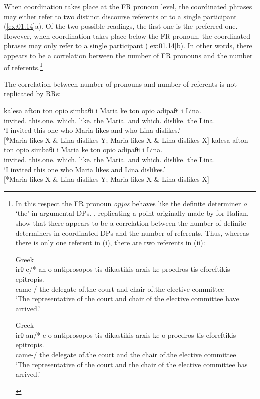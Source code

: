 \documentclass[output=paper]{langsci/langscibook}
\begin{document}
When coordination takes place at the \gls{FR} pronoun level, the coordinated\linebreak
phrases may either refer to two distinct discourse referents or to a single
participant (\ref{ex:01.14}a). Of the two possible readings, the first one
is the preferred one. However, when coordination takes place below the \gls{FR}
pronoun, the coordinated phrases may only refer to a single participant
(\ref{ex:01.14}b). In other words, there appears to be a correlation
between the number of \gls{FR} pronouns and the number of
referents.\footnote{In this respect the \gls{FR} pronoun \emph{opjos} behaves
    like the definite determiner \emph{o} ‘the’ in argumental DPs.
    \textcite[67--68]{AleHaeSta2007}, replicating a point originally made by
    \citet{Longobardi1994} for Italian, show that there appears to be a
    correlation between the number of definite determiners in coordinated DPs
    and the number of referents. Thus, whereas there is only one referent in
    (i), there are two referents in (ii):

\begin{exe}
     Greek\\
	\gll irθ-e/*-an o antiprosopos tis {dikastikis arxis} ke proedros tis eforeftikis epitropis.\\
        came-\Tsg/\Pl{} the delegate of.the court and chair of.the elective committee\\
	\glt \enquote*{The representative of the court and chair of the elective committee have arrived.}

     Greek\\
    \gll irθ-an/*-e o antiprosopos tis {dikastikis arxis} ke o proedros tis eforeftikis epitropis.\\
        came-\Tpl/\Sg{} the delegate of.the court and the chair of.the elective committee\\
	\glt \enquote*{The representative of the court and the chair of the elective committee has arrived.}
\end{exe}
}

The correlation between number of pronouns and number of referents is not
replicated by \glspl{RR}:\largerpage

\ea {}\label{ex:01.15}
	\ea
		\gll kalesa afton {ton opio} simbaθi i Maria ke {ton opio} adipaθi i Lina.\\
			invited.\Fsg{} this.one.\Acc{} which.\Acc{} like.\Tsg{} the Maria.\Nom{} and  which.\Acc{} dislike.\Tsg{} the Lina.\Nom{}\\
		\glt \enquote*{I invited this one who Maria likes and who Lina dislikes.}\\
        {}[*Maria likes X \& Lina dislikes Y;  Maria likes X \& Lina dislikes X]
	\ex
		\gll kalesa afton {ton opio} simbaθi i Maria ke {ton opio} adipaθi i Lina.\\
			invited.\Fsg{} this.one.\Acc{} which.\Acc{} like.\Tsg{} the Maria.\Nom{} and  which.\Acc{} dislike.\Tsg{} the Lina.\Nom{}\\
		\glt \enquote*{I invited this one who Maria likes and Lina dislikes.}\\
        {}[*Maria likes X \& Lina dislikes Y;  Maria likes X \& Lina dislikes X]
	\z
\z
\end{document}
